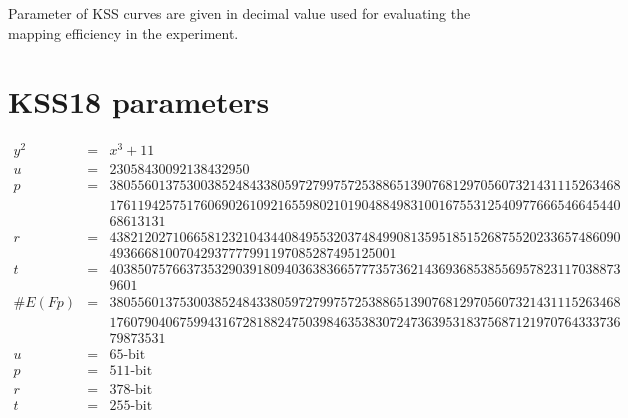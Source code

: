 \begin{appendices}
Parameter of KSS curves are given in decimal value used for evaluating the mapping efficiency in the experiment.
\section{KSS18 parameters}
\label{appendix:KSS18}
\begin{eqnarray}
y^2 & = & x^3 + 11 \nonumber \\ 
u & = & 23058430092138432950 \nonumber \\ 
p & = &  3805560137530038524843380597279975725388651390768129705607321431115263468 \nonumber \\
& & 1761194257517606902610921655980210190488498310016755312540977666546645440 \nonumber \\
& & 68613131 \nonumber \\
r & = &  4382120271066581232104344084955320374849908135951851526875520233657486090 \nonumber \\
& &  49366681007042937777991197085287495125001 \nonumber \\
t & = &  4038507576637353290391809403638366577735736214369368538556957823117038873\nonumber \\
& & 9601\nonumber \\
\#E(Fp) & = &  3805560137530038524843380597279975725388651390768129705607321431115263468 \nonumber \\
& &  1760790406759943167281882475039846353830724736395318375687121970764333736 \nonumber \\
& & 79873531 \nonumber \\
u & = & 65\text{-bit}  \nonumber \\
p & = & 511\text{-bit}  \nonumber \\
r &  = & 378\text{-bit}  \nonumber \\
t & = & 255\text{-bit} \nonumber
\end{eqnarray}



\end{appendices}
